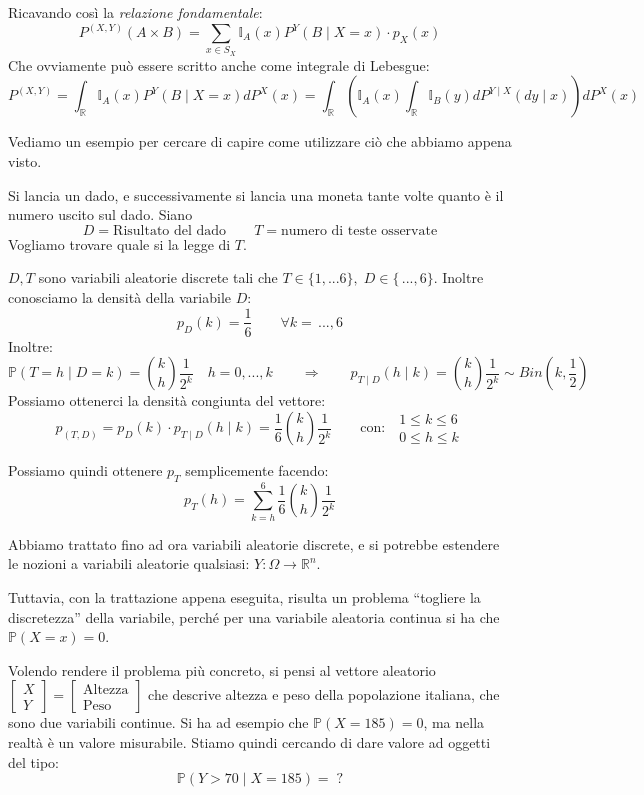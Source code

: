 \noindent Ricavando così la \textit{relazione fondamentale}:
\[\boxed{P^{(X, Y)}(A\times B) = \sum_{x\in S_X}\mathbb{I}_{A}(x)P^{Y}(B\mid X=x)\cdot p_X(x)}\]
Che ovviamente può essere scritto anche come integrale di Lebesgue:
\[P^{(X, Y)} = \int_\mathbb{R}\mathbb{I}_A(x) P^Y(B\mid X=x) dP^X(x) = \int_\mathbb{R} \left(\mathbb{I}_A(x)\int_\mathbb{R} \mathbb{I}_B(y) dP^{Y\mid X}(dy\mid x)\right)dP^X(x)\]

\bigskip
\noindent Vediamo un esempio per cercare di capire come utilizzare ciò che abbiamo appena visto.
\begin{esempio}
\label{es:leggi_cond}
    Si lancia un dado, e successivamente si lancia una moneta tante volte quanto è il numero uscito sul dado. Siano
    \[D = \text{Risultato del dado}\qquad T = \text{numero di teste osservate}\]
    Vogliamo trovare quale si la legge di $T$.

    \medskip
    \noindent $D,T$ sono variabili aleatorie discrete tali che $T\in\{1, ...6\}, \; D\in \{\, ..., 6\}$. Inoltre conosciamo la densità della variabile $D$:
    \[p_D(k) = \frac{1}{6}\qquad \forall k=\, ..., 6 \]
    Inoltre:
    \[\mathbb{P}(T=h\mid D=k) = \binom{k}{h}\frac{1}{2^k}\quad h=0, ..., k \qquad \Rightarrow\qquad p_{T\mid D}(h\mid k) = \binom{k}{h}\frac{1}{2^k} \sim Bin\left(k, \frac{1}{2}\right)\]
    Possiamo ottenerci la densità congiunta del vettore:
    \[p_{(T, D)} = p_D(k)\cdot p_{T\mid D}(h\mid k) = \frac{1}{6} \binom{k}{h}\frac{1}{2^k}\qquad \text{con: }\;\begin{aligned}1\leq k\leq 6\\ 0\leq h\leq k\end{aligned}\]

    \noindent Possiamo quindi ottenere $p_T$ semplicemente facendo:
    \[p_T(h) = \sum_{k=h}^6 \frac{1}{6} \binom{k}{h}\frac{1}{2^k}\]
\end{esempio}

\bigskip
\noindent Abbiamo trattato fino ad ora variabili aleatorie discrete, e si potrebbe estendere le nozioni a variabili aleatorie qualsiasi: $Y:\Omega\to\mathbb{R}^n$. 

\medskip
Tuttavia, con la trattazione appena eseguita, risulta un problema ``togliere la discretezza'' della variabile, perché per una variabile aleatoria continua si ha che $\mathbb{P}(X=x) = 0$.

\medskip
\noindent Volendo rendere il problema più concreto, si pensi al vettore aleatorio $\begin{bmatrix}
    X\\Y
\end{bmatrix} = \begin{bmatrix}
    \text{Altezza}\\
    \text{Peso}
\end{bmatrix}$ che descrive altezza e peso della popolazione italiana, che sono due variabili continue. Si ha ad esempio che $\mathbb{P}(X=185) = 0$, ma nella realtà è un valore misurabile. Stiamo quindi cercando di dare valore ad oggetti del tipo:
\[\mathbb{P}(Y>70\mid X=185) = \;?\]

